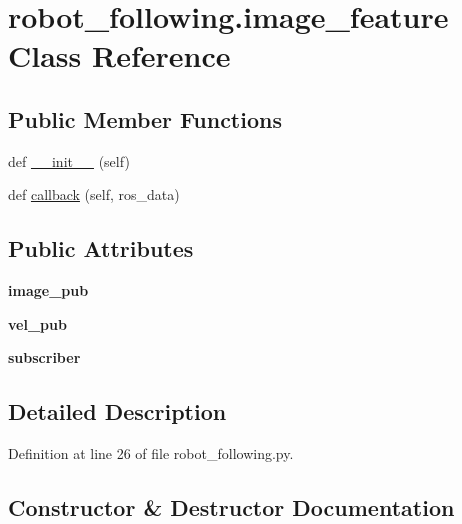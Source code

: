 \hypertarget{classrobot__following_1_1image__feature}{}\section{robot\+\_\+following.\+image\+\_\+feature Class Reference}
\label{classrobot__following_1_1image__feature}
\subsection*{Public Member Functions}
\begin{DoxyCompactItemize}
\item 
def \hyperlink{classrobot__following_1_1image__feature_ad21c13434a4653ea1a64fb00a742a3ae}{\+\_\+\+\_\+init\+\_\+\+\_\+} (self)
\item 
def \hyperlink{classrobot__following_1_1image__feature_af3eddd8a93175ab03651d9ea0352ab56}{callback} (self, ros\+\_\+data)
\end{DoxyCompactItemize}
\subsection*{Public Attributes}
\begin{DoxyCompactItemize}
\item 
\mbox{\label{classrobot__following_1_1image__feature_a1246d1d342e919f2f2a00d3f8f887245}} 
{\bfseries image\+\_\+pub}
\item 
\mbox{\label{classrobot__following_1_1image__feature_a745a8de4e922b376f83df74a882d7d2a}} 
{\bfseries vel\+\_\+pub}
\item 
\mbox{\label{classrobot__following_1_1image__feature_a08612a4f188d867aca7844e1e30fb44e}} 
{\bfseries subscriber}
\end{DoxyCompactItemize}


\subsection{Detailed Description}


Definition at line 26 of file robot\+\_\+following.\+py.



\subsection{Constructor \& Destructor Documentation}
\mbox{\label{classrobot__following_1_1image__feature_ad21c13434a4653ea1a64fb00a742a3ae}} 
